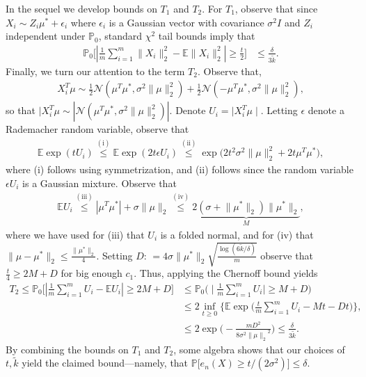 \documentclass[twoside,11pt]{article}
\newcommand{\Exs}{\ensuremath{{\mathbb{E}}}}
\newcommand{\numobs}{\ensuremath{n}}
\newcommand{\NORMAL}{\ensuremath{\mathcal{N}}}
\def\EE{ \mathbb{E} }
\newcommand{\norm}[1]{\ensuremath{\|#1\|_2}}
\newcommand{\subsize}{\numobs} %
\newcommand{\subprob}{\delta}
\newcommand{\blocksize}{\ensuremath{m}}
\newcommand{\tk}{\ensuremath{\tilde{k}}}
\newcommand{\paramobs}{\mu}
\newcommand{\samperror}[1]{e_{#1}}
\newcommand{\mprob}{\ensuremath{\mathbb{P}}}
\newcommand{\defn}{: \, = }
\newcommand{\mustar}{\ensuremath{\mu^*}}
\begin{document}
\noindent In the sequel we develop bounds on $T_1$ and $T_2$.  For
$T_1$, observe that since $X_i \sim Z_i \mu^* + \epsilon_i$
where $\epsilon_i$ is a Gaussian vector with covariance $\sigma^2 I$ and
$Z_i$ independent under $\mprob_0$,
standard $\chi^2$ tail bounds imply that
\begin{align*}
\mprob_0 \Big[ | \frac{1}{\blocksize}\sum_{i=1}^\blocksize \|X_i\|_2^2
  - \EE \|X_i\|_2^2 | \geq \frac{t}{2} \Big] & \leq
\frac{\subprob}{3\tk}.
\end{align*}
Finally, we turn our attention to the term $T_2$. Observe that,
\begin{align*}
X_i^T \mu \sim \frac{1}{2} \NORMAL( \mu^T \mu^*, \sigma^2
\|\paramobs\|_2^2) + \frac{1}{2} \NORMAL( -\mu^T \mu^*, \sigma^2
\|\paramobs\|_2^2),
\end{align*}
so that $ \mid X_i^T \mu \sim |\NORMAL( \mu^T \mu^*, \sigma^2
\|\paramobs\|_2^2) |$.  Denote $U_i = \mid X_i^T \mu \mid$. Letting
$\epsilon$ denote a Rademacher random variable, observe that
\begin{align*}
\Exs \exp (t U_i) \stackrel{\mathrm{(i)}}{\leq} \mathbb{E} \exp (2 t
\epsilon U_i) \stackrel{\mathrm{(ii)}}{\leq} \exp \big( 2 t^2 \sigma^2
\|\paramobs\|_2^2 + 2 t \mu^T \mu^* \big),
\end{align*}
where (i) follows using symmetrization, and (ii) follows since the
random variable $\epsilon U_i$ is a Gaussian mixture.  Observe that
\begin{align*}
\mathbb{E} U_i \stackrel{\mathrm{(iii)}}{\leq} |\mu^T \mu^*| + \sigma
\|\paramobs\|_2 \stackrel{\mathrm{(iv)}}{\leq} \underbrace{2 ( \sigma
  + \norm{\mustar}) \norm{\mustar}}_{M},
\end{align*}
where we have used for (iii) that $U_i$ is a folded normal, and for
(iv) that $\|\mu - \mustar\|_2 \leq \frac{\|\mustar\|_2}{4}$.  Setting
$D \defn 4 \sigma \norm{\mustar} \sqrt{ \frac{\log
    (6\tk/\subprob)}{\blocksize}}$ observe that $\frac{t}{4} \geq 2 M
+ D$ for big enough $c_1$.  Thus, applying the Chernoff bound yields
\begin{align*}
T_2 \leq \mprob_0 \Big[ |\frac{1}{\blocksize} \sum_{i=1}^\blocksize
  U_i - \mathbb{E} U_i| \geq 2M + D \Big] & \leq \mprob_0 \Big( \mid
\frac{1}{\blocksize} \sum_{i=1}^\blocksize U_i \mid \geq M+ D \Big) \\
%
& \leq 2 \inf_{t \geq 0} \Big\{ \mathbb{E} \exp \Big(
\frac{t}{\blocksize} \sum_{i=1}^\blocksize U_i - Mt - Dt \Big) \Big\},
\\
%
& \leq 2 \exp \Big( - \frac{\blocksize D^2}{ 8 \sigma^2
  \norm{\mu}^2}\Big) \leq \frac{\subprob}{3\tk}.
\end{align*}
By combining the bounds on $T_1$ and $T_2$, some algebra shows that
our choices of $t,\tk$ yield the claimed bound---namely, that $\mprob
\big[ \samperror{\subsize}(X) \geq t/(2\sigma^2) \big] \leq \subprob$.
\end{document}
